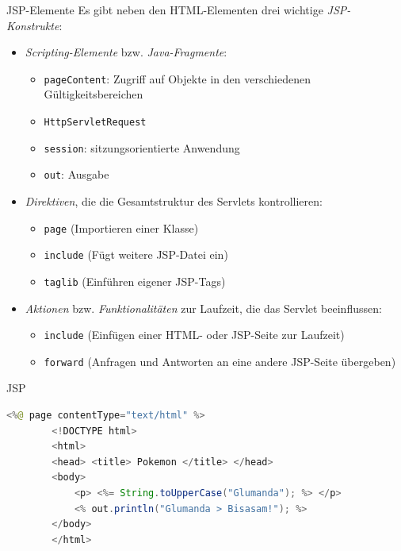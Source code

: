 \begin{bonus}{JSP-Elemente}
    Es gibt neben den HTML-Elementen drei wichtige \emph{JSP-Konstrukte}:
    \begin{itemize}
        \item \emph{Scripting-Elemente} bzw. \emph{Java-Fragmente}:
              \begin{itemize}
                  \item \texttt{pageContent}: Zugriff auf Objekte in den verschiedenen Gültigkeitsbereichen
                  \item \texttt{HttpServletRequest}
                  \item \texttt{session}: sitzungsorientierte Anwendung
                  \item \texttt{out}: Ausgabe
              \end{itemize}
        \item \emph{Direktiven}, die die Gesamtstruktur des Servlets kontrollieren:
              \begin{itemize}
                  \item \texttt{page} (Importieren einer Klasse)
                  \item \texttt{include} (Fügt weitere JSP-Datei ein)
                  \item \texttt{taglib} (Einführen eigener JSP-Tags)
              \end{itemize}
        \item \emph{Aktionen} bzw. \emph{Funktionalitäten} zur Laufzeit, die das Servlet beeinflussen:
              \begin{itemize}
                  \item \texttt{include} (Einfügen einer HTML- oder JSP-Seite zur Laufzeit)
                  \item \texttt{forward} (Anfragen und Antworten an eine andere JSP-Seite übergeben)
              \end{itemize}
    \end{itemize}
\end{bonus}

\begin{example}{JSP}
    \begin{lstlisting}[language=Java, alsolanguage=html5]
        <%@ page contentType="text/html" %>
        <!DOCTYPE html>
        <html>
        <head> <title> Pokemon </title> </head>
        <body>
            <p> <%= String.toUpperCase("Glumanda"); %> </p>
            <% out.println("Glumanda > Bisasam!"); %>
        </body>
        </html>
    \end{lstlisting}
\end{example}

